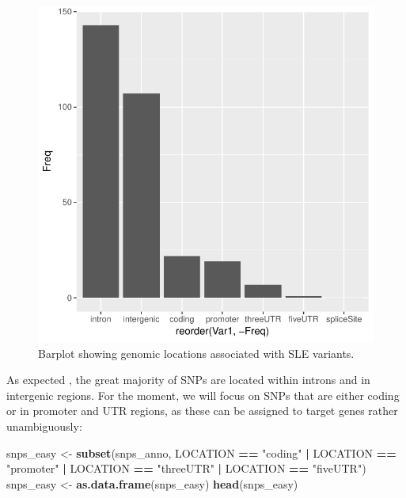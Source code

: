 \documentclass[9pt,a4paper,]{extarticle}
\newenvironment{Shaded}{\begin{snugshade}}{\end{snugshade}}
\newcommand{\KeywordTok}[1]{\textcolor[rgb]{0.13,0.29,0.53}{\textbf{#1}}}
\newcommand{\StringTok}[1]{\textcolor[rgb]{0.31,0.60,0.02}{#1}}
\newcommand{\OperatorTok}[1]{\textcolor[rgb]{0.81,0.36,0.00}{\textbf{#1}}}
\newcommand{\NormalTok}[1]{#1}
\begin{document}
\begin{figure}

{\centering \includegraphics{biocondutor-regulatory-genomics-workflow_files/figure-latex/barplot-1} 

}

\caption{Barplot showing genomic locations associated with SLE variants.}\label{fig:barplot}
\end{figure}

As expected \citep{Maurano2012}, the great majority of SNPs are located within introns and in intergenic regions.
For the moment, we will focus on SNPs that are either coding or in promoter and UTR regions, as these can be assigned to target genes rather unambiguously:

\begin{Shaded}
\begin{Highlighting}[]
\NormalTok{snps_easy <-}\StringTok{ }\KeywordTok{subset}\NormalTok{(snps_anno, LOCATION }\OperatorTok{==}\StringTok{ "coding"} \OperatorTok{|}\StringTok{ }\NormalTok{LOCATION }\OperatorTok{==}\StringTok{ "promoter"} \OperatorTok{|}\StringTok{ }\NormalTok{LOCATION }\OperatorTok{==}\StringTok{ "threeUTR"} \OperatorTok{|}\StringTok{ }\NormalTok{LOCATION }\OperatorTok{==}\StringTok{ "fiveUTR"}\NormalTok{)}
\NormalTok{snps_easy <-}\StringTok{ }\KeywordTok{as.data.frame}\NormalTok{(snps_easy)}
\KeywordTok{head}\NormalTok{(snps_easy)}
\end{Highlighting}
\end{Shaded}
\end{document}
